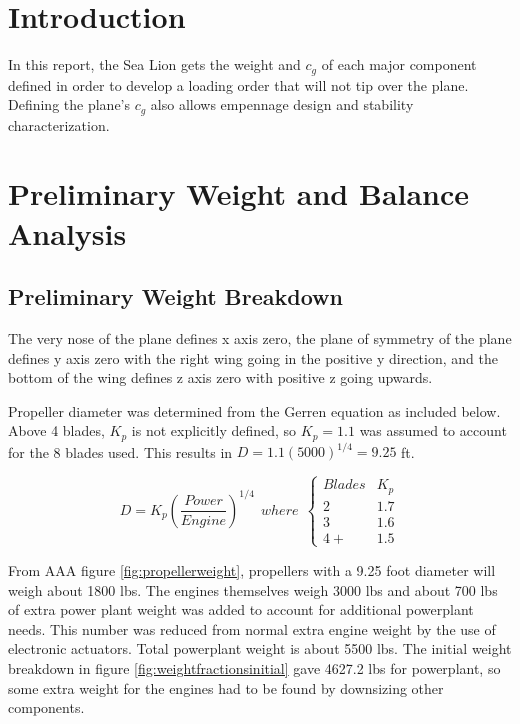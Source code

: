 \documentclass[conf]{new-aiaa}
\begin{document}
\section{Introduction}
In this report, the Sea Lion gets the weight and $c_g$ of each major component defined in order to develop a loading order that will not tip over the plane. Defining the plane's $c_g$ also allows empennage design and stability characterization. 

\section{Preliminary Weight and Balance Analysis}

\subsection{Preliminary Weight Breakdown}

The very nose of the plane defines x axis zero, the plane of symmetry of the plane defines y axis zero with the right wing going in the positive y direction, and the bottom of the wing defines z axis zero with positive z going upwards.

Propeller diameter was determined from the Gerren equation as included below\cite{pres18}. Above 4 blades, $K_p$ is not explicitly defined, so $K_p=1.1$ was assumed to account for the 8 blades used. This results in $D=1.1(5000)^{1/4}=9.25$ ft.

\[ D = K_p(\frac{Power}{Engine})^{1/4} \ \ where\ \ \begin{cases} 
      Blades & K_p \\
      2 & 1.7 \\
      3 &  1.6 \\
      4+ & 1.5 
   \end{cases}
\] 

From AAA figure \ref{fig:propellerweight}, propellers with a 9.25 foot diameter will weigh about 1800 lbs. The engines themselves weigh 3000 lbs and about 700 lbs of extra power plant weight was added to account for additional powerplant needs. This number was reduced from normal extra engine weight by the use of electronic actuators. Total powerplant weight is about 5500 lbs. The initial weight breakdown in figure \ref{fig:weightfractionsinitial} gave 4627.2 lbs for powerplant, so some extra weight for the engines had to be found by downsizing other components. 
\end{document}
